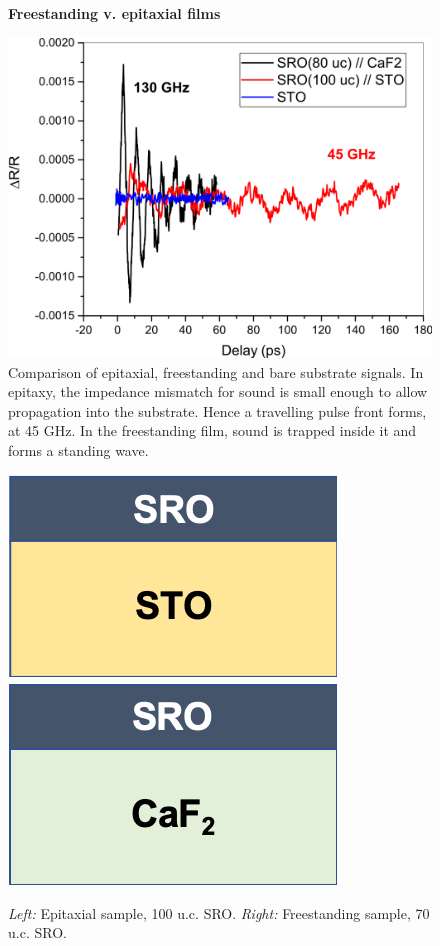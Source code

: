 \documentclass[nobib]{tufte-handout}
\begin{document}
\begin{figure}
	\centering
	\textbf{Freestanding v. epitaxial films}\par\medskip
	\includegraphics[width=\linewidth]{Graphics/comparisons.png}
	\caption{Comparison of epitaxial, freestanding and bare substrate signals. In epitaxy, the impedance mismatch for sound is small enough to allow propagation into the substrate. Hence a travelling pulse front forms, at 45 GHz. In the freestanding film, sound is trapped inside it and forms a standing wave.}
	\label{fig:comparisons}
\end{figure}

\begin{figure}
	\includegraphics[width=0.49\linewidth]{Graphics/SRO-STO.png}
	\includegraphics[width=0.49\linewidth]{Graphics/SRO-CaF2.png}
	\caption{\textit{Left:} Epitaxial sample, 100 u.c. SRO. \textit{Right:} Freestanding sample, 70 u.c. SRO.}
\end{figure}
\end{document}

